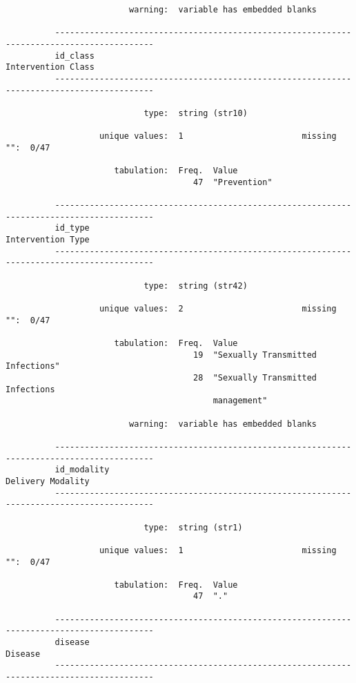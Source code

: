 \documentclass{article}
\begin{document}
\begin{verbatim}
                         warning:  variable has embedded blanks
          
          ------------------------------------------------------------------------------------------
          id_class                                                                Intervention Class
          ------------------------------------------------------------------------------------------
          
                            type:  string (str10)
          
                   unique values:  1                        missing "":  0/47
          
                      tabulation:  Freq.  Value
                                      47  "Prevention"
          
          ------------------------------------------------------------------------------------------
          id_type                                                                  Intervention Type
          ------------------------------------------------------------------------------------------
          
                            type:  string (str42)
          
                   unique values:  2                        missing "":  0/47
          
                      tabulation:  Freq.  Value
                                      19  "Sexually Transmitted Infections"
                                      28  "Sexually Transmitted Infections
                                          management"
          
                         warning:  variable has embedded blanks
          
          ------------------------------------------------------------------------------------------
          id_modality                                                              Delivery Modality
          ------------------------------------------------------------------------------------------
          
                            type:  string (str1)
          
                   unique values:  1                        missing "":  0/47
          
                      tabulation:  Freq.  Value
                                      47  "."
          
          ------------------------------------------------------------------------------------------
          disease                                                                            Disease
          ------------------------------------------------------------------------------------------
          

\end{verbatim}
\end{document}

